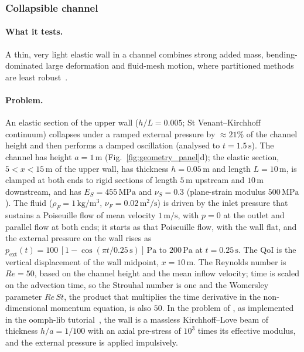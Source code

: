 \subsubsection{Collapsible channel}\label{sec:collapsible}

\paragraph{What it tests.}
A thin, very light elastic wall in a channel combines strong added mass, bending-dominated large deformation and fluid-mesh motion, where partitioned methods are least robust~\citep{Jensen2003, Heil2004, Heil2008}.

\paragraph{Problem.}
An elastic section of the upper wall ($h/L = 0.005$; St Venant--Kirchhoff continuum) collapses under a ramped external pressure by $\approx21\%$ of the channel height and then performs a damped oscillation (analysed to $t = 1.5\,\mathrm{s}$).
The channel has height $a = 1\,\mathrm{m}$ (Fig.~\ref{fig:geometry_panel}d); the elastic section, $5 < x < 15\,\mathrm{m}$ of the upper wall, has thickness $h = 0.05\,\mathrm{m}$ and length $L = 10\,\mathrm{m}$, is clamped at both ends to rigid sections of length $5\,\mathrm{m}$ upstream and $10\,\mathrm{m}$ downstream, and has $E_S = 455\,\mathrm{MPa}$ and $\nu_S = 0.3$ (plane-strain modulus $500\,\mathrm{MPa}$).
The fluid ($\rho_F = 1\,\mathrm{kg/m^3}$, $\nu_F = 0.02\,\mathrm{m^2/s}$) is driven by the inlet pressure that sustains a Poiseuille flow of mean velocity $1\,\mathrm{m/s}$, with $p = 0$ at the outlet and parallel flow at both ends; it starts as that Poiseuille flow, with the wall flat, and the external pressure on the wall rises as $p_\mathrm{ext}(t) = 100\,[1 - \cos(\pi t/0.25\,\mathrm{s})]\,\mathrm{Pa}$ to $200\,\mathrm{Pa}$ at $t = 0.25\,\mathrm{s}$.
The QoI is the vertical displacement of the wall midpoint, $x = 10\,\mathrm{m}$.
The Reynolds number is $Re = 50$, based on the channel height and the mean inflow velocity; time is scaled on the advection time, so the Strouhal number is one and the Womersley parameter $Re\,St$, the product that multiplies the time derivative in the non-dimensional momentum equation, is also $50$.
In the problem of \citet{Jensen2003}, as implemented in the oomph-lib tutorial~\citep{Heil2006}, the wall is a massless Kirchhoff--Love beam of thickness $h/a = 1/100$ with an axial pre-stress of $10^3$ times its effective modulus, and the external pressure is applied impulsively.
